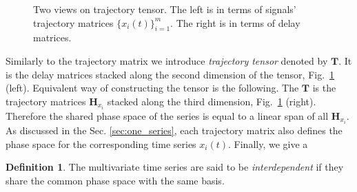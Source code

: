 \documentclass[referee, pdflatex, sn-mathphys-num]{sn-jnl}
\theoremstyle{definition}
\newtheorem*{Def}{Definition}
\theoremstyle{plain}
\begin{document}
	\begin{figure}[h]
		\centering
		
		\caption{Two views on trajectory tensor. The left is in terms of signals' trajectory matrices $ \{x_i(t)\}_{i=1}^m $. The right is in terms of delay matrices.}\label{pic:traj_tensor}
	\end{figure}
	
	Similarly to the trajectory matrix we introduce \textit{trajectory tensor} denoted by $ \mathbf{T} $. It is the delay matrices stacked along the second dimension of the tensor, Fig.~\ref{pic:traj_tensor} (left). Equivalent way of constructing the tensor is the following. The $ \mathbf{T} $ is the trajectory matrices $ \mathbf{H}_{x_i} $ stacked along the third dimension, Fig.~\ref{pic:traj_tensor} (right). Therefore the shared phase space of the series is equal to a linear span of all $ \mathbf{H}_{x_i} $. As discussed in the Sec. \ref{sec:one_series}, each trajectory matrix also defines the phase space for the corresponding time series $ x_i(t) $. Finally, we give a 
	
	\begin{Def}		
		The multivariate time series are said to be \emph{interdependent} if they share the common phase space with the same basis.
	\end{Def}
	
\end{document}
